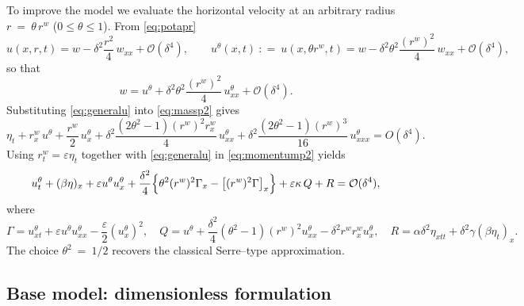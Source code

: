 \documentclass[alpha-refs, 12pt]{wiley-article}
\renewcommand{\O}{\mathcal{O}}
\renewcommand{\leq}{\leqslant}
\newcommand{\eqdef}{\mathrel{\mathop:}=}
\begin{document}
To improve the model we evaluate the horizontal velocity at an arbitrary radius $r\ =\ \theta\,r^{w}$ ($0 \leq \theta \leq 1$). From \eqref{eq:potapr}
\[
  u(x,r,t)
  =w
   -\delta^{2}\frac{r^{2}}{4}\,w_{xx}
   +\O(\delta^{4}),
  \qquad
  u^{\theta}(x,t) \ \eqdef\ u(x,\theta r^{w},t)
  =w-\delta^{2}\theta^{2}\frac{(r^{w})^{2}}{4}\,w_{xx}+\O(\delta^{4}),
\]
so that
\begin{equation}\label{eq:generalu}
  w=u^{\theta}
    +\delta^{2}\theta^{2}\frac{(r^{w})^{2}}{4}\,u^{\theta}_{xx}
    +\O(\delta^{4}).
\end{equation}
Substituting \eqref{eq:generalu} into \eqref{eq:massp2} gives
\begin{equation}\label{eq:massp4}
  \eta_{t}
  +r^{w}_{x}\,u^{\theta}
  +\frac{r^{w}}{2}\,u^{\theta}_{x}
  +\delta^{2}\frac{(2\theta^{2}-1)(r^{w})^{2}r^{w}_{x}}{4}\,
        u^{\theta}_{xx}
  +\delta^{2}\frac{(2\theta^{2}-1)(r^{w})^{3}}{16}\,
        u^{\theta}_{xxx}
  =O(\delta^{4}).
\end{equation}
Using $r^{w}_{t}=\varepsilon\eta_{t}$ together with
\eqref{eq:generalu} in \eqref{eq:momentump2} yields
\begin{equation}\label{eq:momentump4}
  u^{\theta}_{t}
  +(\beta\eta)_{x}
  +\varepsilon u^{\theta}u^{\theta}_{x}
  +\frac{\delta^{2}}{4}
     \Bigl\{\theta^{2}(r^{w})^{2}\Gamma_{x}
            -\bigl[(r^{w})^{2}\Gamma\bigr]_{x}\Bigr\}
  +\varepsilon\kappa\,Q
  +R
  = \O(\delta^{4}),
\end{equation}
where
\begin{equation}\label{eq:gamman}
  \Gamma
  =u^{\theta}_{x t}
   +\varepsilon u^{\theta}u^{\theta}_{xx}
   -\frac{\varepsilon}{2}(u^{\theta}_{x})^{2},\quad
  Q
  =u^{\theta}
   +\frac{\delta^{2}}{4}(\theta^{2}-1)(r^{w})^{2}u^{\theta}_{xx}
   -\delta^{2}r^{w}r^{w}_{x}u^{\theta}_{x},\quad
  R
  =\alpha\delta^{2}\eta_{x t t}
   +\delta^{2}\gamma(\beta\eta_{t})_{x}.
\end{equation}
The choice $\theta^{2}\ =\ 1/2$ recovers the classical Serre–type approximation.

\subsection{Base model: dimensionless formulation}
\end{document}
